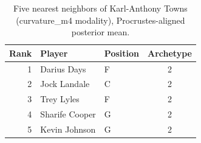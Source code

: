 \begin{table}[htbp]
  \centering\small
  \begin{tabular}{rllc}
    \toprule
    Rank & Player & Position & Archetype \\
    \midrule
    1 & Darius Days & F & 2 \\
    2 & Jock Landale & C & 2 \\
    3 & Trey Lyles & F & 2 \\
    4 & Sharife Cooper & G & 2 \\
    5 & Kevin Johnson & G & 2 \\
    \bottomrule
  \end{tabular}
  \caption{Five nearest neighbors of Karl-Anthony Towns (curvature_m4 modality), Procrustes-aligned posterior mean.}
  \label{tab:Karl_Anthony_Towns_neighbors_curvature_m4}
\end{table}

